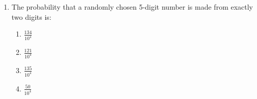 \documentclass[journal,9pt,twocolumn]{IEEEtran}
\begin{document}
\begin{enumerate}
\item  The probability that a randomly chosen 5-digit number is made from exactly two digits is:
\begin{multicols}{4}
\begin{enumerate}
    \item $\frac{134}{10^4}$
    \item $\frac{121}{10^4}$
    \item $\frac{135}{10^4}$
    \item $\frac{50}{10^4}$
\end{enumerate}
\end{multicols}
\end{enumerate}
\end{document}
